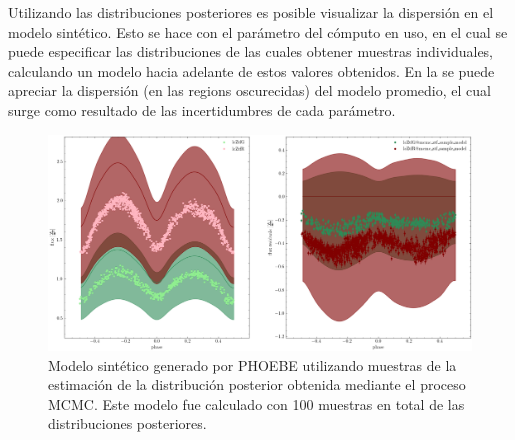 Utilizando las distribuciones posteriores es posible visualizar la dispersión en
el modelo sintético. Esto se hace con el parámetro  del
cómputo en uso, en el cual se puede especificar las distribuciones de las cuales
obtener muestras individuales, calculando un modelo hacia adelante de estos
valores obtenidos. En la  se
puede apreciar la dispersión (en las regions oscurecidas) del modelo promedio,
el cual surge como resultado de las incertidumbres de cada parámetro.

\begin{figure}[!ht]
	\centering
	\includegraphics[scale=0.51]{Metodologia/Secciones/ModeloComputacional/Figures/Figura MCMC ZTF Modelo.png}
	\caption{Modelo sintético generado por PHOEBE utilizando muestras de la
	estimación de la distribución posterior obtenida mediante el proceso MCMC.
	Este modelo fue calculado con 100 muestras en total de las distribuciones
	posteriores.}
	\label{figuraMcmcZtfModeloDispersionPosterior}
\end{figure}
